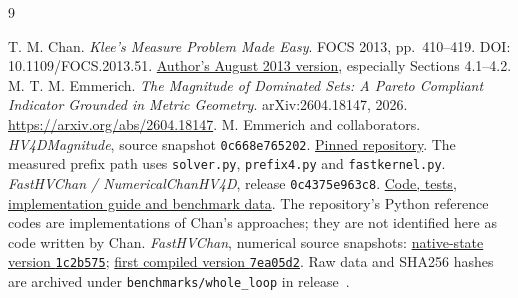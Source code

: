 \documentclass[12pt,a4paper]{article}
\begin{document}
\begin{thebibliography}{9}\raggedright
{} T. M. Chan. \emph{Klee's Measure Problem Made Easy}.
FOCS 2013, pp.~410--419. DOI: 10.1109/FOCS.2013.51.
\href{https://tmc.web.engr.illinois.edu/easyklee8_13.pdf}{Author's August 2013 version},
especially Sections 4.1--4.2.
 M. T. M. Emmerich.
\emph{The Magnitude of Dominated Sets: A Pareto Compliant Indicator Grounded
in Metric Geometry}. arXiv:2604.18147, 2026.
\url{https://arxiv.org/abs/2604.18147}.
 M. Emmerich and collaborators. \emph{HV4DMagnitude},
source snapshot \texttt{0c668e765202}.
\href{https://github.com/emmerichmtm/HV4DMagnitude/tree/0c668e76520201f41ac0f144caa8d468d6c84e86}{Pinned repository}.
The measured prefix path uses \texttt{solver.py}, \texttt{prefix4.py} and
\texttt{fastkernel.py}.
 \emph{FastHVChan / NumericalChanHV4D}, release
\texttt{0c4375e963c8}.
\href{https://github.com/emmerichmtm/FastHVChan/tree/0c4375e963c8c054b7ebba10b715ba55de6e9529/NumericalChanHV4D}{Code, tests, implementation guide and benchmark data}.
The repository's Python reference codes are implementations of Chan's
approaches; they are not identified here as code written by Chan.
 \emph{FastHVChan}, numerical source snapshots:
\href{https://github.com/emmerichmtm/FastHVChan/tree/1c2b5756477e4bc428b0b49acd4b7e9cc1526609}{native-state version \texttt{1c2b575}};
\href{https://github.com/emmerichmtm/FastHVChan/tree/7ea05d21b67de869268740096fad32a1117b0430}{first compiled version \texttt{7ea05d2}}.
Raw data and SHA256 hashes are archived under \texttt{benchmarks/whole\_loop}
in release~\cite{release}.
\end{thebibliography}
\end{document}
